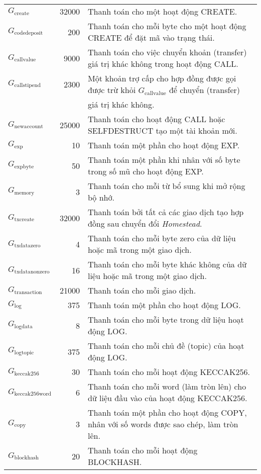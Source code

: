 \documentclass[9pt,oneside]{amsart}
\begin{document}
\begin{tabu}{l r l}
$G_{\mathrm{create}}$ & 32000 & Thanh toán cho một hoạt động {\small CREATE}. \\
$G_{\mathrm{codedeposit}}$ & 200 & Thanh toán cho mỗi byte cho một hoạt động {\small CREATE} để đặt mã vào trạng thái. \\
$G_{\mathrm{callvalue}}$ & 9000 & Thanh toán cho việc chuyển khoản (transfer) giá trị khác không trong hoạt động {\small CALL}. \\
$G_{\mathrm{callstipend}}$ & 2300 & Một khoản trợ cấp cho hợp đồng được gọi được trừ khỏi $G_{\mathrm{callvalue}}$ để chuyển (transfer) \\
&&giá trị khác không. \\
$G_{\mathrm{newaccount}}$ & 25000 & Thanh toán cho hoạt động {\small CALL} hoặc {\small SELFDESTRUCT} tạo một tài khoản mới. \\
$G_{\mathrm{exp}}$ & 10 & Thanh toán một phần cho hoạt động {\small EXP}. \\
$G_{\mathrm{expbyte}}$ & 50 & Thanh toán một phần khi nhân với số byte trong số mũ cho hoạt động {\small EXP}. \\
$G_{\mathrm{memory}}$ & 3 & Thanh toán cho mỗi từ bổ sung khi mở rộng bộ nhớ. \\
$G_\text{txcreate}$ & 32000 & Thanh toán bởi tất cả các giao dịch tạo hợp đồng sau chuyển đổi {\textit{Homestead}}.\\
$G_{\mathrm{txdatazero}}$ & 4 & Thanh toán cho mỗi byte zero của dữ liệu hoặc mã trong một giao dịch. \\
$G_{\mathrm{txdatanonzero}}$ & 16 & Thanh toán cho mỗi byte khác không của dữ liệu hoặc mã trong một giao dịch. \\
$G_{\mathrm{transaction}}$ & 21000 & Thanh toán cho mỗi giao dịch. \\
$G_{\mathrm{log}}$ & 375 & Thanh toán một phần cho hoạt động {\small LOG}. \\
$G_{\mathrm{logdata}}$ & 8 & Thanh toán cho mỗi byte trong dữ liệu hoạt động {\small LOG}. \\
$G_{\mathrm{logtopic}}$ & 375 & Thanh toán cho mỗi chủ đề (topic) của hoạt động {\small LOG}. \\
$G_{\mathrm{keccak256}}$ & 30 & Thanh toán cho mỗi hoạt động {\small KECCAK256}. \\
$G_{\mathrm{keccak256word}}$ & 6 & Thanh toán cho mỗi word (làm tròn lên) cho dữ liệu đầu vào của hoạt động {\small KECCAK256}. \\
$G_{\mathrm{copy}}$ & 3 & Thanh toán một phần cho hoạt động {\small *COPY}, nhân với số words được sao chép, làm tròn lên. \\
$G_{\mathrm{blockhash}}$ & 20 & Thanh toán cho mỗi hoạt động {\small BLOCKHASH}. \\

\bottomrule
\end{tabu}
\end{document}
